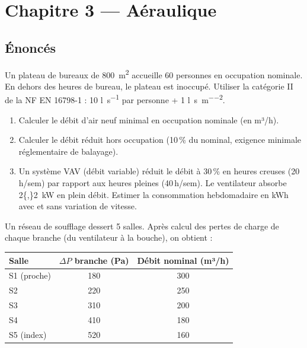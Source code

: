 \chapter*{Chapitre 3 — Aéraulique}

\section*{Énoncés}


Un plateau de bureaux de \SI{800}{\square\metre} accueille 60 personnes en occupation nominale. En dehors des heures de bureau, le plateau est inoccupé. Utiliser la catégorie II de la NF EN 16798-1 : 10 \si{\litre\per\second} par personne + 1 \si{\litre\per\second\per\square\metre}.

\begin{enumerate}
  \item Calculer le débit d'air neuf minimal en occupation nominale (en m³/h).
  \item Calculer le débit réduit hors occupation (10\,\% du nominal, exigence minimale réglementaire de balayage).
  \item Un système VAV (débit variable) réduit le débit à 30\,\% en heures creuses (20\,h/sem) par rapport aux heures pleines (40\,h/sem). Le ventilateur absorbe \SI{2{,}2}{\kilo\watt} en plein débit. Estimer la consommation hebdomadaire en kWh avec et sans variation de vitesse.
\end{enumerate}



Un réseau de soufflage dessert 5 salles. Après calcul des pertes de charge de chaque branche (du ventilateur à la bouche), on obtient :

\begin{center}
\begin{tabular}{lcc}
  \toprule
  Salle & $\Delta P$ branche (Pa) & Débit nominal (m³/h) \\
  \midrule
  S1 (proche) & 180 & 300 \\
  S2 & 220 & 250 \\
  S3 & 310 & 200 \\
  S4 & 410 & 180 \\
  S5 (index) & 520 & 160 \\
  \bottomrule
\end{tabular}
\end{center}

